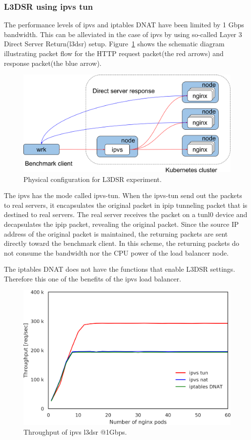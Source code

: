 \FloatBarrier

\subsubsection{L3DSR using ipvs tun}

The performance levels of ipvs and iptables DNAT have been limited by 1 Gbps bandwidth.
This can be alleviated in the case of ipvs by using so-called Layer 3 Direct Server Return(l3dsr) setup.
Figure~\ref{fig:benchmark-schem-dsr} shows the schematic diagram illustrating packet flow for the HTTP request packet(the red arrows) and response packet(the blue arrow).

\begin{figure}[h]
  \centering
  \includegraphics[width=0.8\columnwidth]{Figs/benchmark-schem-dsr}
  \caption{Physical configuration for L3DSR experiment.}
  \label{fig:benchmark-schem-dsr}
\end{figure}

The ipvs has the mode called ipvs-tun.
When the ipvs-tun send out the packets to real servers, it encapsulates the original packet in ipip tunneling packet that is destined to real servers.
The real server receives the packet on a tunl0 device and decapsulates the ipip packet, revealing the original packet.
Since the source IP address of the original packet is maintained, the returning packets are sent directly toward the benchmark client.
In this scheme, the returning packets do not consume the bandwidth nor the CPU power of the load balancer node.

The iptables DNAT does not have the functions that enable L3DSR settings.
Therefore this one of the benefits of the ipvs load balancer.

\begin{figure}[h]
  \centering
  \includegraphics[width=0.8\columnwidth]{Figs/ipvs_l3dsr_1g.png}
  \caption{Throughput of ipvs l3dsr @1Gbps.}
  \label{fig:ipvs_l3dsr_1g.png}
\end{figure}


